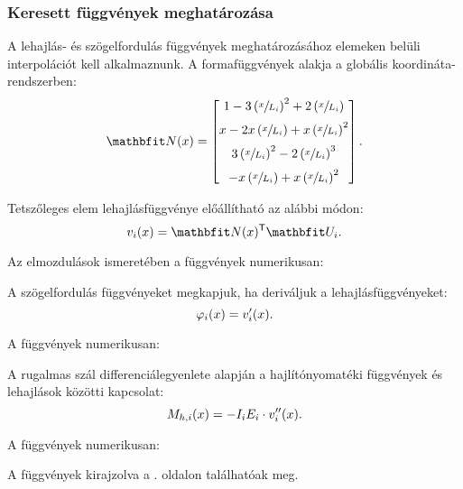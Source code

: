 \subsubsection{Keresett függvények meghatározása}

A lehajlás- és szögelfordulás függvények meghatározásához elemeken belüli 
interpolációt kell alkalmaznunk. A formafüggvények alakja a globális 
koordináta-rendszerben:
\begin{equation}
  \renewcommand\a{\left(\sfrac{x}{L_i}\right)}
  \rvec N(x) =
  \begin{bmatrix}
    1 - 3\a^2 + 2\a  \\[2mm]
    x - 2x\a + x\a^2 \\[2mm]
    3\a^2 - 2\a^3    \\[2mm]
    -x\a + x\a^2
  \end{bmatrix}
  \text.
  \label{eq:N-param}
\end{equation}

Tetszőleges elem lehajlásfüggvénye előállítható az alábbi módon:
\begin{equation}
  v_i(x) = \rvec N(x)^{\mathsf T} \rvec U_i
  \text.
  \label{eq:v-param}
\end{equation}

Az elmozdulások ismeretében a függvények numerikusan:


A szögelfordulás függvényeket megkapjuk, ha deriváljuk a lehajlásfüggvényeket:
\begin{equation}
  \varphi_i(x) = v_i'(x)
  \text.
  \label{eq:phi-param}
\end{equation}

A függvények numerikusan:


A rugalmas szál differenciálegyenlete alapján a hajlítónyomatéki függvények
és lehajlások közötti kapcsolat:
\begin{equation}
  M_{h,i}(x) = -I_i E_i \cdot v_i''(x)
  \text.
  \label{eq:Mh-param}
\end{equation}

A függvények numerikusan:


A függvények kirajzolva a \pageref{fig:plot-v}. oldalon találhatóak meg.

